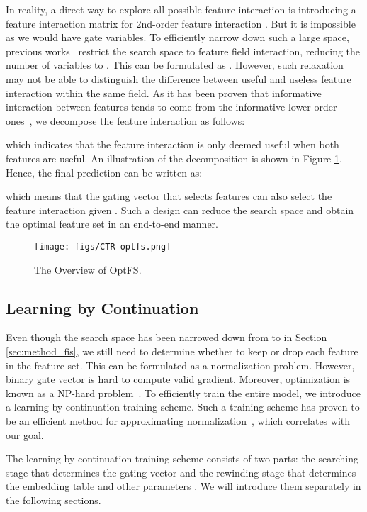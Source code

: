 \documentclass[sigconf]{acmart}
\begin{document}
In reality, a direct way to explore all possible feature interaction is introducing a feature interaction matrix  for 2nd-order feature interaction . But it is impossible as we would have  gate variables. To efficiently narrow down such a large space, previous works~\cite{AutoFIS, AutoFeature, OptInter} restrict the search space to feature field interaction, reducing the number of variables to . This can be formulated as . However, such relaxation may not be able to distinguish the difference between useful and useless feature interaction within the same field. 
As it has been proven that informative interaction between features tends to come from the informative lower-order ones~\cite{FIVES}, we decompose the feature interaction as follows:

which indicates that the feature interaction is only deemed useful when both features are useful. An illustration of the decomposition is shown in Figure \ref{fig:overall}. Hence, the final prediction can be written as:

which means that the gating vector  that selects features can also select the feature interaction given . Such a design can reduce the search space and obtain the optimal feature set in an end-to-end manner.

\begin{figure}[!t]
    \centering
    \texttt{[image: figs/CTR-optfs.png]}
    \vspace{-10pt}
    \caption{The Overview of OptFS.}
    \vspace{-10pt}
    \label{fig:overall}
\end{figure}

\subsection{Learning by Continuation}
\label{sec:method_lbc}
Even though the search space has been narrowed down from  to  in Section \ref{sec:method_fis}, we still need to determine whether to keep or drop each feature in the feature set. This can be formulated as a  normalization problem. However, binary gate vector  is hard to compute valid gradient. Moreover,  optimization is known as a NP-hard problem~\cite{l2norm}. To efficiently train the entire model, we introduce a learning-by-continuation training scheme. Such a training scheme has proven to be an efficient method for approximating  normalization~\cite{Cont_Spar}, which correlates with our goal.

The learning-by-continuation training scheme consists of two parts: the searching stage that determines the gating vector  and the rewinding stage that determines the embedding table  and other parameters . We will introduce them separately in the following sections.
\end{document}
